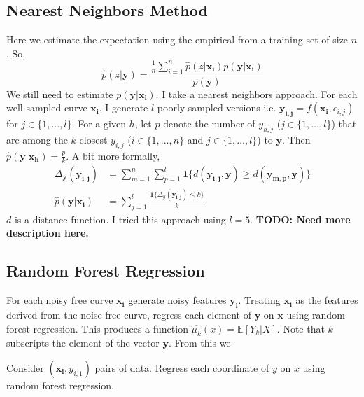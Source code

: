 \documentclass[10pt]{article}
\begin{document}
\subsection{Nearest Neighbors Method}
Here we estimate the expectation using the empirical from a training set of size $n$. So,
\begin{equation*}
\hat{p}(z | \mathbf{y}) = \frac{\frac{1}{n}\sum_{i=1}^n \hat{p}(z|\mathbf{x_i})p(\mathbf{y}|\mathbf{x_i})}{p(\mathbf{y})}
\end{equation*}
We still need to estimate $p(\mathbf{y}|\mathbf{x_i})$. I take a nearest neighbors approach. For each well sampled curve $\mathbf{x_i}$, I generate $l$ poorly sampled versions i.e. $\mathbf{y_{i,j}} = f(\mathbf{x_i},\epsilon_{i,j})$ for $j \in \{1, \ldots, l\}$. For a given $h$, let $p$ denote the number of $y_{h,j}$ ($j \in \{1, \ldots ,l\}$) that are among the $k$ closest $y_{i,j}$ ($i \in \{1, \ldots ,n\}$ and $j \in \{1, \ldots ,l\}$) to $\mathbf{y}$. Then $\hat{p}(\mathbf{y}|\mathbf{x_h}) = \frac{p}{k}$. A bit more formally,
\begin{align*}
\Delta_\mathbf{y}(\mathbf{y_{i,j}}) &= \sum_{m=1}^n \sum_{p=1}^{l} \mathbf{1}\{d(\mathbf{y_{i,j}},\mathbf{y}) \geq d(\mathbf{y_{m,p}},\mathbf{y})\}\\
\hat{p}(\mathbf{y}|\mathbf{x_i}) &= \sum_{j=1}^l \frac{\mathbf{1}\{\Delta_y(\mathbf{y_{i,j}}) \leq k\}}{k}
\end{align*}
$d$ is a distance function. I tried this approach using $l=5$. \textbf{TODO: Need more description here.}


\subsection{Random Forest Regression}
For each noisy free curve $\mathbf{\mathbf{x_i}}$ generate noisy features $\mathbf{y_i}$. Treating $\mathbf{x_i}$ as the features derived from the noise free curve, regress each element of $\mathbf{y}$ on $\mathbf{x}$ using random forest regression. This produces a function $\hat{\mu_k}(x) = \mathbb{E}[Y_k|X]$. Note that $k$ subscripts the element of the vector $\mathbf{y}$. From this we

Consider $(\mathbf{x_i},y_{i,1})$ pairs of data. Regress each coordinate of $y$ on $x$ using random forest regression.
\end{document}
